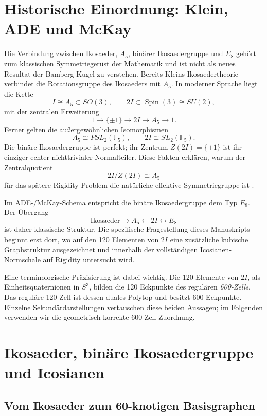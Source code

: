 \documentclass[11pt,a4paper]{article}
\theoremstyle{definition}
\begin{document}
\section{Historische Einordnung: Klein, ADE und McKay}

Die Verbindung zwischen Ikosaeder, $A_5$, binärer Ikosaedergruppe und $E_8$ gehört zum klassischen Symmetriegerüst der Mathematik und ist nicht als neues Resultat der Bamberg-Kugel zu verstehen. Bereits Kleins Ikosaedertheorie verbindet die Rotationsgruppe des Ikosaeders mit $A_5$. In moderner Sprache liegt die Kette
\[
I\cong A_5\subset SO(3),\qquad
2I\subset \operatorname{Spin}(3)\cong SU(2),
\]
mit der zentralen Erweiterung
\[
1\longrightarrow\{\pm1\}\longrightarrow2I\longrightarrow A_5\longrightarrow1.
\]
Ferner gelten die außergewöhnlichen Isomorphismen
\[
A_5\cong PSL_2(\mathbb F_5),\qquad
2I\cong SL_2(\mathbb F_5).
\]
Die binäre Ikosaedergruppe ist perfekt; ihr Zentrum $Z(2I)=\{\pm1\}$ ist ihr einziger echter nichttrivialer Normalteiler. Diese Fakten erklären, warum der Zentralquotient
\[
2I/Z(2I)\cong A_5
\]
für das spätere Rigidity-Problem die natürliche effektive Symmetriegruppe ist \cite{nLab2I}.

Im ADE-/McKay-Schema entspricht die binäre Ikosaedergruppe dem Typ $E_8$. Der Übergang
\[
\boxed{\text{Ikosaeder}\longrightarrow A_5\longleftarrow2I\longleftrightarrow E_8}
\]
ist daher klassische Struktur. Die spezifische Fragestellung dieses Manuskripts beginnt erst dort, wo auf den 120 Elementen von $2I$ eine zusätzliche kubische Graphstruktur ausgezeichnet und innerhalb der vollständigen Icosianen-Normschale auf Rigidity untersucht wird.

Eine terminologische Präzisierung ist dabei wichtig. Die 120 Elemente von $2I$, als Einheitsquaternionen in $S^3$, bilden die 120 Eckpunkte des regulären \emph{600-Zells}. Das reguläre 120-Zell ist dessen duales Polytop und besitzt 600 Eckpunkte. Einzelne Sekundärdarstellungen vertauschen diese beiden Aussagen; im Folgenden verwenden wir die geometrisch korrekte 600-Zell-Zuordnung.

\section{Ikosaeder, binäre Ikosaedergruppe und Icosianen}

\subsection{Vom Ikosaeder zum 60-knotigen Basisgraphen}
\end{document}
